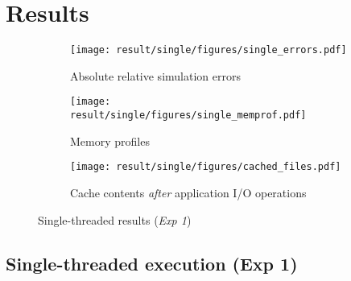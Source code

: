 \documentclass[conference]{IEEEtran}
\newcommand{\wrench}{WRENCH\xspace}
\begin{document}


    \section{Results}
    \label{results}



    \begin{figure*}
        \centering
        \begin{subfigure}{\linewidth}
            \centering
               \texttt{[image: result/single/figures/single\_errors.pdf]}
               \vspace*{-0.7cm}
               \caption{Absolute relative simulation errors}
               \vspace*{0.5cm}
               \label{fig:single_error}
            \end{subfigure}
        \begin{subfigure}{\linewidth}
            \centering
               \texttt{[image: result/single/figures/single\_memprof.pdf]}
               \vspace*{-0.7cm}
               \caption{Memory profiles}
               \vspace*{0.5cm}
               \label{fig:single_memprof}
        \end{subfigure}
        \begin{subfigure}{\linewidth}
            \centering
               \texttt{[image: result/single/figures/cached\_files.pdf]}
               \caption{Cache contents \emph{after} application I/O operations}
               \label{fig:single_cache}
        \end{subfigure}
        \caption{Single-threaded results (\textit{Exp 1})}
        \end{figure*}


        \subsection{Single-threaded execution (Exp 1)}
\end{document}
